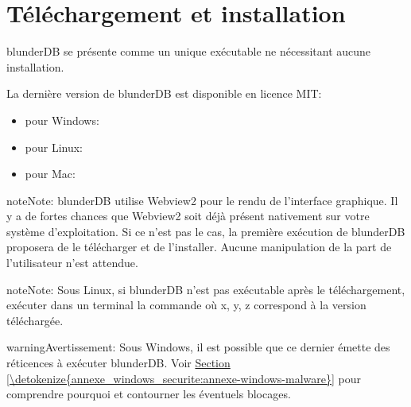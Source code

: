 \documentclass[letterpaper,10pt,french]{sphinxmanual}
\begin{document}
\section{Téléchargement et installation}
\label{\detokenize{telecharge_install:telechargement-et-installation}}\label{\detokenize{telecharge_install::doc}}
\sphinxAtStartPar
blunderDB se présente comme un unique exécutable ne nécessitant aucune installation.

\sphinxAtStartPar
La dernière version de blunderDB est disponible en licence MIT:
\begin{itemize}
\item {} 
\sphinxAtStartPar
pour Windows: 

\item {} 
\sphinxAtStartPar
pour Linux: 

\item {} 
\sphinxAtStartPar
pour Mac: 

\end{itemize}

\begin{sphinxadmonition}{note}{Note:}
\sphinxAtStartPar
blunderDB utilise Webview2 pour le rendu de l’interface graphique. Il
y a de fortes chances que Webview2 soit déjà présent nativement sur votre
système d’exploitation. Si ce n’est pas le cas, la première exécution de
blunderDB proposera de le télécharger et de l’installer. Aucune manipulation
de la part de l’utilisateur n’est attendue.
\end{sphinxadmonition}

\begin{sphinxadmonition}{note}{Note:}
\sphinxAtStartPar
Sous Linux, si blunderDB n’est pas exécutable après le
téléchargement, exécuter dans un terminal la commande  où x, y, z correspond à la version téléchargée.
\end{sphinxadmonition}

\begin{sphinxadmonition}{warning}{Avertissement:}
\sphinxAtStartPar
Sous Windows, il est possible que ce dernier émette des réticences
à exécuter blunderDB. Voir \hyperref[\detokenize{annexe_windows_securite:annexe-windows-malware}]{Section \ref{\detokenize{annexe_windows_securite:annexe-windows-malware}}} pour comprendre
pourquoi et contourner les éventuels blocages.
\end{sphinxadmonition}
\end{document}
